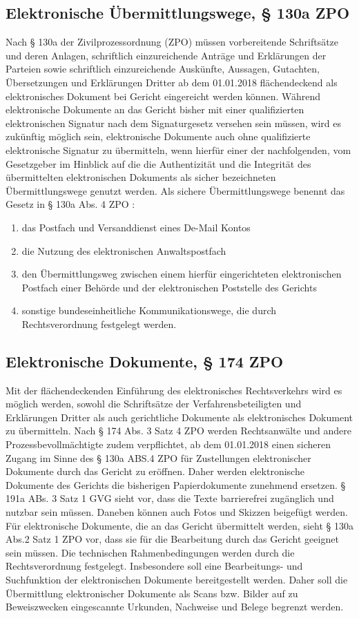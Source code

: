 \subsection{Elektronische Übermittlungswege, § 130a ZPO}
Nach § 130a der Zivilprozessordnung (ZPO) müssen vorbereitende Schriftsätze und deren Anlagen, schriftlich einzureichende Anträge und Erklärungen der Parteien sowie schriftlich einzureichende Auskünfte, Aussagen, Gutachten, Übersetzungen und Erklärungen Dritter ab dem 01.01.2018 flächendeckend als elektronisches Dokument bei Gericht eingereicht werden können. Während elektronische Dokumente an das Gericht bisher mit einer qualifizierten elektronischen Signatur nach dem Signaturgesetz versehen sein müssen, wird es zukünftig möglich sein, elektronische Dokumente auch ohne qualifizierte elektronische Signatur zu übermitteln, wenn hierfür einer der nachfolgenden, vom Gesetzgeber im Hinblick auf die die Authentizität und die Integrität des übermittelten elektronischen Dokuments als sicher bezeichneten Übermittlungswege genutzt werden. Als sichere Übermittlungswege benennt das Gesetz in § 130a Abs. 4 ZPO :
\begin{enumerate}
\item das Postfach und Versanddienst eines De-Mail Kontos
\item die Nutzung des elektronischen Anwaltspostfach 
\item den Übermittlungsweg zwischen einem hierfür eingerichteten elektronischen Postfach einer Behörde und der elektronischen Poststelle des Gerichts 
\item sonstige bundeseinheitliche Kommunikationswege, die durch Rechtsverordnung festgelegt werden.
\end{enumerate} 
\subsection{Elektronische Dokumente, § 174 ZPO}
Mit der flächendeckenden Einführung des elektronisches Rechtsverkehrs wird es möglich werden, sowohl die Schriftsätze der Verfahrensbeteiligten und Erklärungen Dritter als auch gerichtliche Dokumente als elektronisches Dokument zu übermitteln. Nach § 174 Abs. 3 Satz 4 ZPO werden Rechtsanwälte und andere Prozessbevollmächtigte zudem verpflichtet, ab dem 01.01.2018 einen sicheren Zugang im Sinne des § 130a ABS.4 ZPO für Zustellungen elektronischer Dokumente durch das Gericht zu eröffnen. Daher werden elektronische Dokumente des Gerichts die bisherigen Papierdokumente zunehmend ersetzen. § 191a ABs. 3 Satz 1 GVG sieht vor, dass die Texte barrierefrei zugänglich und nutzbar sein müssen. Daneben können auch Fotos und Skizzen beigefügt werden. Für elektronische Dokumente, die an das Gericht übermittelt werden, sieht § 130a Abs.2 Satz 1 ZPO vor, dass sie für die Bearbeitung durch das Gericht geeignet sein müssen. Die technischen Rahmenbedingungen werden durch die Rechtsverordnung festgelegt. Insbesondere soll eine Bearbeitungs- und Suchfunktion der elektronischen Dokumente bereitgestellt werden. Daher soll die Übermittlung elektronischer Dokumente als Scans bzw. Bilder auf zu Beweiszwecken eingescannte Urkunden, Nachweise und Belege begrenzt werden. 
